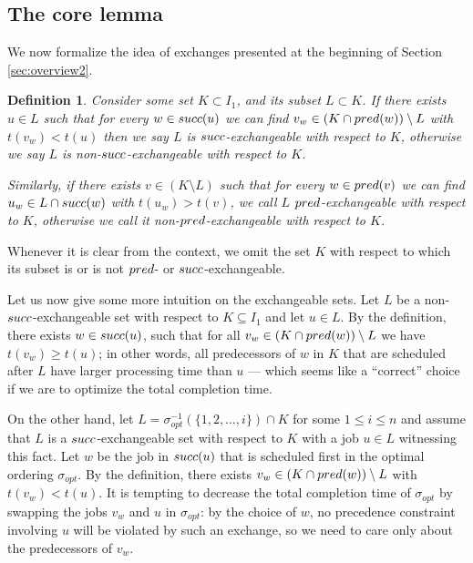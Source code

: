 \documentclass{article}
\newtheorem{definition}[theorem]{Definition}
\theoremstyle{definition}
\begin{document}
\subsection{The core lemma}\label{sec:core}

We now formalize the idea of exchanges presented at the beginning of Section \ref{sec:overview2}.
\begin{definition}\label{def:xch}
Consider some set $K \subset I_1$, and its subset $L \subset K$.
If there exists $u \in L$ such that for every $w \in {\ensuremath{succ}}(u)$ we can
find $v_w \in (K \cap {\ensuremath{pred}}(w)) \setminus L$ with $t(v_w) < t(u)$ then
we say $L$ is {\em ${succ}$-exchangeable} with respect to $K$, otherwise
we say $L$ is {\em non-${succ}$-exchangeable} with respect to $K$.

Similarly, if there exists $v \in (K \setminus L)$ such that for every $w \in {\ensuremath{pred}}(v)$
we can find $u_w \in L \cap {\ensuremath{succ}}(w)$ with $t(u_w) > t(v)$,
we call $L$ {\em ${pred}$-exchangeable} with respect to $K$, otherwise we call
it {\em non-${pred}$-exchangeable} with respect to $K$.
\end{definition}

Whenever it is clear from the context, we omit the set $K$ with respect to which its subset is
or is not ${pred}$- or ${succ}$-exchangeable.

Let us now give some more intuition on the exchangeable sets.
Let $L$ be a non-${succ}$-exchangeable set with respect to $K \subseteq I_1$ and let $u \in L$.
By the definition, there exists $w \in {\ensuremath{succ}}(u)$, such that for all $v_w \in (K \cap {\ensuremath{pred}}(w)) \setminus L$
we have $t(v_w) \geq t(u)$; in other words, all predecessors of $w$ in $K$ that are scheduled after $L$
have larger processing time than $u$ --- which seems like a ``correct'' choice if we are to optimize the total completion time.

On the other hand, let $L = \sigma_{opt}^{-1}(\{1,2,\ldots,i\}) \cap K$ for some $1 \leq i \leq n$ and
assume that $L$ is a ${succ}$-exchangeable set with respect to $K$ with a job $u \in L$ witnessing this fact.
Let $w$ be the job in ${succ}(u)$ that is scheduled first in the optimal ordering $\sigma_{opt}$.
By the definition, there exists $v_w \in (K \cap {\ensuremath{pred}}(w)) \setminus L$ with $t(v_w) < t(u)$.
It is tempting to decrease the total completion time of $\sigma_{opt}$ by swapping the jobs $v_w$ and $u$ in $\sigma_{opt}$: by the choice of $w$, no precedence constraint
involving $u$ will be violated by such an exchange, so we need to care only about the predecessors of $v_w$.
\end{document}
